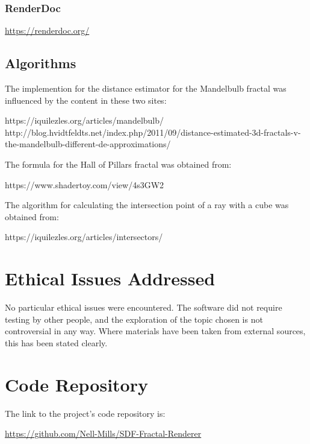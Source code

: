 \begin{appendices}
\subsection{RenderDoc}

\url{https://renderdoc.org/}

\section{Algorithms}

The implemention for the distance estimator for the Mandelbulb fractal was influenced by the content in these two sites:\newline

https://iquilezles.org/articles/mandelbulb/\newline
http://blog.hvidtfeldts.net/index.php/2011/09/distance-estimated-3d-fractals-v-the-mandelbulb-different-de-approximations/\newline

The formula for the Hall of Pillars fractal was obtained from:\newline

https://www.shadertoy.com/view/4s3GW2\newline

The algorithm for calculating the intersection point of a ray with a cube was obtained from:\newline

https://iquilezles.org/articles/intersectors/

\chapter{Ethical Issues Addressed}

No particular ethical issues were encountered. The software did not require testing by other people, and the exploration of the topic chosen is not controversial in any way. Where materials have been taken from external sources, this has been stated clearly.

\chapter{Code Repository}\label{appendix:code-repository}

The link to the project's code repository is:\newline

\url{https://github.com/Nell-Mills/SDF-Fractal-Renderer}

\end{appendices}